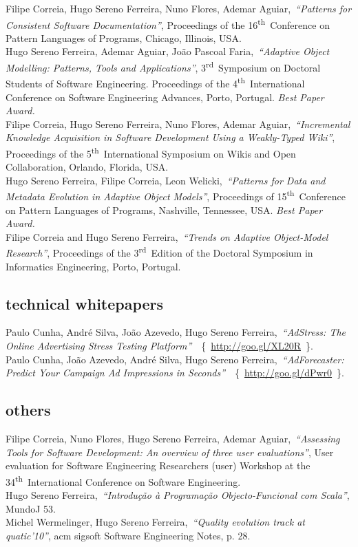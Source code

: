 \documentclass[9pt, a4paper, pstricks]{article}
\newcommand{\current}{{\hspace{-0.97em}\color{feup}$\star$}~}
\newcommand{\years}[1]{\marginnote{\small #1}}
\newcommand{\nth}{\textsuperscript{th}~}
\newcommand{\rd}{\textsuperscript{rd}~}
\newcommand{\inurl}[1]{~\{~{\small\url{#1}~}\}}
\begin{document}
\years{2009}Filipe Correia, Hugo Sereno Ferreira, Nuno Flores, Ademar Aguiar,~\emph{``Patterns for Consistent Software Documentation''}, Proceedings of the 16\nth Conference on Pattern Languages of Programs, Chicago, Illinois, USA.\\
\years{\current~2009}Hugo Sereno Ferreira, Ademar Aguiar, João Pascoal Faria,~\emph{``Adaptive Object Modelling: Patterns, Tools and Applications''}, 3\rd Symposium on Doctoral Students of Software Engineering. Proceedings of the 4\nth International Conference on Software Engineering Advances, Porto, Portugal. {\color{feup} \emph{Best Paper Award.}}\\
\years{2009}Filipe Correia, Hugo Sereno Ferreira, Nuno Flores, Ademar Aguiar,~\emph{``Incremental Knowledge Acquisition in Software Development Using a Weakly-Typed Wiki''}, Proceedings of the 5\nth International Symposium on Wikis and Open Collaboration, Orlando, Florida, USA.\\
\years{\current~2008}Hugo Sereno Ferreira, Filipe Correia, Leon Welicki,~\emph{``Patterns for Data and Metadata Evolution in Adaptive Object Models''}, Proceedings of 15\nth Conference on Pattern Languages of Programs, Nashville, Tennessee, USA. {\color{feup} \emph{Best Paper Award.}}\\
\years{2008}Filipe Correia and Hugo Sereno Ferreira,~\emph{``Trends on Adaptive Object-Model Research''}, Proceedings of the 3\rd Edition of the Doctoral Symposium in Informatics Engineering, Porto, Portugal.

\subsection*{technical whitepapers}
\noindent\years{2012}Paulo Cunha, André Silva, João Azevedo, Hugo Sereno Ferreira,~\emph{``AdStress: The Online Advertising Stress Testing Platform''}~\inurl{http://goo.gl/XL20R}.\\
\years{2012}Paulo Cunha, João Azevedo, André Silva, Hugo Sereno Ferreira,~\emph{``AdForecaster: Predict Your Campaign Ad Impressions in Seconds''}~\inurl{http://goo.gl/dPwr0}.

\subsection*{others}
\noindent
\years{2012}Filipe Correia, Nuno Flores, Hugo Sereno Ferreira, Ademar Aguiar,~\emph{``Assessing Tools for Software Development: An overview of three user evaluations''}, User evaluation for Software Engineering Researchers ({\sc user}) Workshop at the 34\nth International Conference on Software Engineering.\\
\years{2012}Hugo Sereno Ferreira,~\emph{``Introdução à Programação Objecto-Funcional com Scala''}, MundoJ 53.\\
\years{2011}Michel Wermelinger, Hugo Sereno Ferreira,~\emph{``Quality evolution track at {\sc quatic}’10''}, {\sc acm sigsoft} Software Engineering Notes, p. 28.
\end{document}
